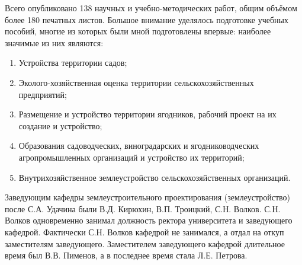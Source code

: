 Всего опубликовано 138 научных и учебно-методических работ, общим объёмом более 180 печатных листов. Большое внимание уделялось подготовке учебных пособий, многие из которых были мной подготовлены впервые: наиболее значимые из них являются: 
\begin{enumerate}
	\item Устройства территории садов; 
	\item Эколого-хозяйственная оценка территории сельскохозяйственных предприятий; 
	\item Размещение и устройство территории ягодников, рабочий проект на их создание и устройство; 
	\item Образования садоводческих, виноградарских и ягодниководческих агропромышленных организаций и устройство их территорий;
	\item Внутрихозяйственное землеустройство сельскохозяйственных организаций.
\end{enumerate}

Заведующим кафедры землеустроительного проектирования (землеустройство) после С.А. Удачина были В.Д. Кирюхин, В.П. Троицкий, С.Н. Волков. С.Н. Волков одновременно занимал должность ректора университета и заведующего кафедрой. Фактически С.Н. Волков кафедрой не занимался, а отдал на откуп заместителям заведующего. Заместителем заведующего кафедрой длительное время был В.В. Пименов, а в последнее время стала Л.Е. Петрова. 

